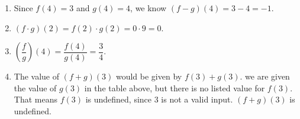\documentclass{ximera}
\begin{document}
\begin{example}
\begin{explanation}
\begin{enumerate}
				\item Since $f(4)=3$ and $g(4)=4$, we know $(f-g)(4)=3-4 = -1$.

				\item $(f\cdot g)(2) = f(2)\cdot g(2) = 0 \cdot 9 = 0$.

				\item $\left( \dfrac{f}{g}\right)(4) = \dfrac{f(4)}{g(4)}=\dfrac{3}{4}$.
				
				\item The value of $(f+g)(3)$ would be given by $f(3)+g(3)$. we are given the value of $g(3)$ in the table above, but there is no listed
					value for $f(3)$. That means $f(3)$ is undefined, since $3$ is not a valid input. $(f+g)(3)$ is undefined.
			\end{enumerate}
		\end{explanation}
	\end{example}	
\end{document}
